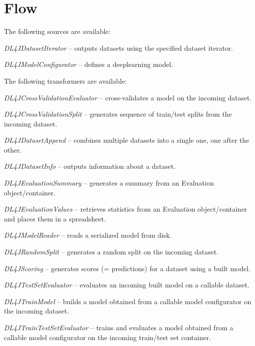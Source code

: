 \documentclass[a4paper]{book}
\begin{document}
\chapter{Flow}

The following sources are available:
\begin{tight_itemize}
  \item \textit{DL4JDatasetIterator} -- outputs datasets using the specified
  dataset iterator.
  \item \textit{DL4JModelConfigurator} -- defines a deeplearning model.
\end{tight_itemize}

The following transformers are available:
\begin{tight_itemize}
  \item \textit{DL4JCrossValidationEvaluator} -- cross-validates a model
  on the incoming dataset.
  \item \textit{DL4JCrossValidationSplit} -- generates sequence of train/test
  splits from the incoming dataset.
  \item \textit{DL4JDatasetAppend} -- combines multiple datasets into a single one,
  one after the other.
  \item \textit{DL4JDatasetInfo} -- outputs information about a dataset.
  \item \textit{DL4JEvaluationSummary} -- generates a summary from an Evaluation
  object/container.
  \item \textit{DL4JEvaluationValues} -- retrieves statistics from an Evaluation
  object/container and places them in a spreadsheet.
  \item \textit{DL4JModelReader} -- reads a serialized model from disk.
  \item \textit{DL4JRandomSplit} -- generates a random split on the incoming dataset.
  \item \textit{DL4JScoring} -- generates scores (= predictions) for a dataset
  using a built model.
  \item \textit{DL4JTestSetEvaluator} -- evaluates an incoming built model on a
  callable dataset.
  \item \textit{DL4JTrainModel} -- builds a model obtained from a callable model
  configurator on the incoming dataset.
  \item \textit{DL4JTrainTestSetEvaluator} -- trains and evaluates a model obtained
  from a callable model configurator on the incoming train/test set container.
\end{tight_itemize}
\end{document}
